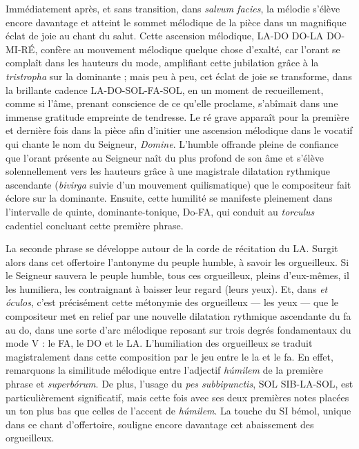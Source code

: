 \documentclass[Session2026.tex]{subfiles}
\begin{document}
Immédiatement après, et sans transition, dans \emph{salvum facies}, la
mélodie s'élève encore davantage et atteint le sommet mélodique de la
pièce dans un magnifique éclat de joie au chant du salut. Cette
ascension mélodique, LA-DO DO-LA DO-MI-RÉ, confère au mouvement
mélodique quelque chose d'exalté, car l'orant se complaît dans les
hauteurs du mode, amplifiant cette jubilation grâce à la
\emph{tristropha} sur la dominante ; mais peu à peu, cet éclat de joie
se transforme, dans la brillante cadence LA-DO-SOL-FA-SOL, en un moment
de recueillement, comme si l'âme, prenant conscience de ce qu'elle
proclame, s'abîmait dans une immense gratitude empreinte de tendresse.
Le ré grave apparaît pour la première et dernière fois dans la pièce
afin d'initier une ascension mélodique dans le vocatif qui chante le nom
du Seigneur, \emph{Domine}. L'humble offrande pleine de confiance que
l'orant présente au Seigneur naît du plus profond de son âme et s'élève
solennellement vers les hauteurs grâce à une magistrale dilatation
rythmique ascendante (\emph{bivirga} suivie d'un mouvement
quilismatique) que le compositeur fait éclore sur la dominante. Ensuite,
cette humilité se manifeste pleinement dans l'intervalle de quinte,
dominante-tonique, Do-FA, qui conduit au \emph{torculus} cadentiel
concluant cette première phrase.

La seconde phrase se développe autour de la corde de récitation du LA.
Surgit alors dans cet offertoire l'antonyme du peuple humble, à savoir
les orgueilleux. Si le Seigneur sauvera le peuple humble, tous ces
orgueilleux, pleins d'eux-mêmes, il les humiliera, les contraignant à
baisser leur regard (leurs yeux). Et, dans \emph{et óculos}, c'est
précisément cette métonymie des orgueilleux --- les yeux --- que le
compositeur met en relief par une nouvelle dilatation rythmique
ascendante du fa au do, dans une sorte d'arc mélodique reposant sur
trois degrés fondamentaux du mode V : le FA, le DO et le LA.
L'humiliation des orgueilleux se traduit magistralement dans cette
composition par le jeu entre le la et le fa. En effet, remarquons la
similitude mélodique entre l'adjectif \emph{húmilem} de la première
phrase et \emph{superbórum}. De plus, l'usage du \emph{pes
subbipunctis}, SOL SIB-LA-SOL, est particulièrement significatif, mais
cette fois avec ses deux premières notes placées un ton plus bas que
celles de l'accent de \emph{húmilem}. La touche du SI bémol, unique dans
ce chant d'offertoire, souligne encore davantage cet abaissement des
orgueilleux.
\end{document}
